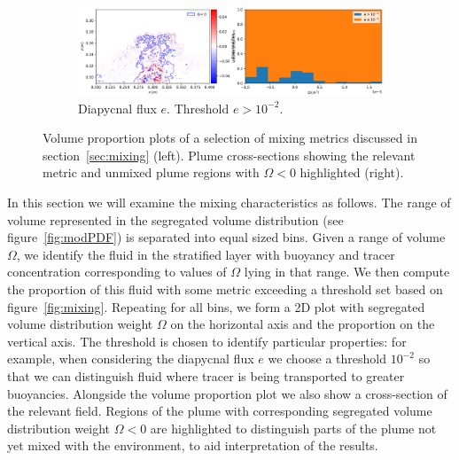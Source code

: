 \documentclass[a4paper]{article}
\begin{document}
\begin{figure}
{\begin{subfigure}[c]{0.6\textwidth}
			\centering
			\includegraphics[width=\textwidth]{e_vol}
			\caption{Diapycnal flux $e$. Threshold $e > 10^{-2}$.}
			\label{fig:e_vol}
		\end{subfigure}
	}
	\caption{Volume proportion plots of a selection of mixing metrics discussed in section~\ref{sec:mixing}
	(left). Plume cross-sections showing the relevant metric and unmixed plume regions
	with $\Omega < 0$ highlighted (right).}
\end{figure}

In this section we will examine the mixing characteristics as follows. The range of volume represented in the
segregated volume distribution (see figure~\ref{fig:modPDF}) is separated into equal sized bins. Given a range
of volume $\Omega$, we identify the fluid in the stratified layer with buoyancy and tracer concentration
corresponding to values of $\Omega$ lying in that range. We then compute the proportion of this fluid with
some metric exceeding a threshold set based on figure~\ref{fig:mixing}. Repeating for all bins, we form a 2D
plot with segregated volume distribution weight $\Omega$ on the horizontal axis and the proportion on the
vertical axis. The threshold is chosen to identify particular properties: for example, when considering the
diapycnal flux $e$ we choose a threshold $10^{-2}$ so that we can distinguish fluid where tracer is being
transported to greater buoyancies. Alongside the volume proportion plot we also show a cross-section of the
relevant field. Regions of the plume with corresponding segregated volume distribution weight $\Omega < 0$ are
highlighted to distinguish parts of the plume not yet mixed with the environment, to aid interpretation of the
results.
\end{document}
